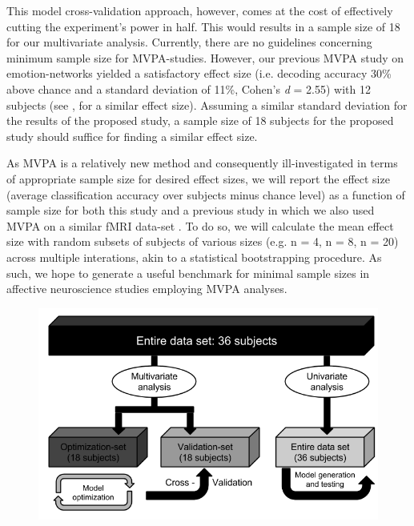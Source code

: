 \documentclass[12pt,a4paper]{article}\usepackage[]{graphicx}\usepackage[]{color}
\begin{document}
This model cross-validation approach, however, comes at the cost of effectively cutting the experiment's power in half. This would results in a sample size of 18 for our multivariate analysis. Currently, there are no guidelines concerning minimum sample size for MVPA-studies. However, our previous MVPA study on emotion-networks \citep{oosterwijk2015} yielded a satisfactory effect size (i.e. decoding accuracy 30\% above chance and a standard deviation of 11\%, Cohen's \emph{d} = 2.55) with 12 subjects (see \citealp{baucom2012}, for a similar effect size). Assuming a similar standard deviation for the results of the proposed study, a sample size of 18 subjects for the proposed study should suffice for finding a similar effect size.

As MVPA is a relatively new method and consequently ill-investigated in terms of appropriate sample size for desired effect sizes, we will report the effect size (average classification accuracy over subjects minus chance level) as a function of sample size for both this study and a previous study in which we also used MVPA on a similar fMRI data-set \citep{oosterwijk2015}. To do so, we will calculate the mean effect size with random subsets of subjects of various sizes (e.g. n = 4, n = 8, n = 20) across multiple interations, akin to a statistical bootstrapping procedure. As such, we hope to generate a useful benchmark for minimal sample sizes in affective neuroscience studies employing MVPA analyses.   

\begin{figure}[t]
\centering
\includegraphics[scale=.5]{ModelOptimization}
\end{figure}
\end{document}
